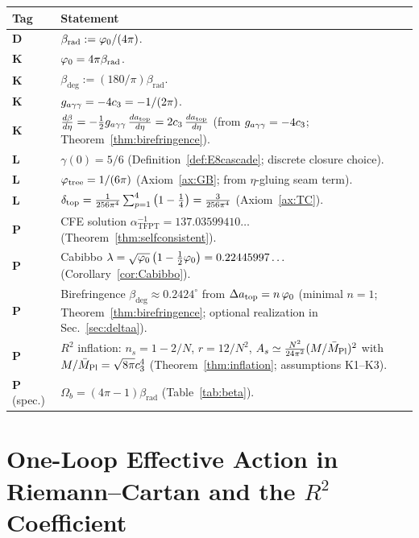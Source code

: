 \begin{center}
\renewcommand{\arraystretch}{1.2}
\begin{tabular}{@{}lp{12cm}@{}}
\toprule
\textbf{Tag} & \textbf{Statement}\\
\midrule
\textbf{D} & $\beta_{\text{rad}} := \varphi_0/(4\pi)$.\\
\textbf{K} & $\varphi_0 = 4\pi\beta_{\text{rad}}$.\\
\textbf{K} & $\beta_{\text{deg}} := (180/\pi)\beta_{\text{rad}}$.\\
\textbf{K} & $g_{a\gamma\gamma} = -4c_3 = -1/(2\pi)$.\\
\textbf{K} & $\frac{d\beta}{d\eta} = -\frac{1}{2}g_{a\gamma\gamma}\,\frac{d a_{\text{top}}}{d\eta} = 2c_3\,\frac{d a_{\text{top}}}{d\eta}$ (from $g_{a\gamma\gamma}=-4c_3$; Theorem~\ref{thm:birefringence}).\\
\textbf{L} & $\gamma(0)=5/6$ (Definition~\ref{def:E8cascade}; discrete closure choice).\\
\textbf{L} & $\varphi_{\mathrm{tree}} = 1/(6\pi)$ (Axiom~\ref{ax:GB}; from $\eta$-gluing seam term).\\
\textbf{L} & $\delta_{\mathrm{top}} = \frac{1}{256\pi^4}\sum_{p=1}^{4}\left(1-\frac{1}{4}\right)=\frac{3}{256\pi^4}$ (Axiom~\ref{ax:TC}).\\
\textbf{P} & CFE solution $\alpha^{-1}_{\text{TFPT}} = 137.03599410\ldots$ (Theorem~\ref{thm:selfconsistent}).\\
\textbf{P} & Cabibbo $\lambda = \sqrt{\varphi_0}\left(1-\frac{1}{2}\varphi_0\right)=0.22445997\ldots$ (Corollary~\ref{cor:Cabibbo}).\\
\textbf{P} & Birefringence $\beta_{\text{deg}} \approx 0.2424^\circ$ from $\Delta a_{\text{top}} = n\,\varphi_0$ (minimal $n=1$; Theorem~\ref{thm:birefringence}; optional realization in Sec.~\ref{sec:deltaa}).\\
\textbf{P} & $R^2$ inflation: $n_s=1-2/N$, $r=12/N^2$, $A_s \simeq \frac{N^2}{24\pi^2}(M/\bar{M}_{\mathrm{Pl}})^2$ with $M/\bar{M}_{\mathrm{Pl}}=\sqrt{8\pi}c_3^4$ (Theorem~\ref{thm:inflation}; assumptions K1--K3).\\
\textbf{P} (spec.) & $\Omega_b = (4\pi-1)\beta_{\text{rad}}$ (Table~\ref{tab:beta}).\\
\bottomrule
\end{tabular}
\end{center}

\section{One-Loop Effective Action in Riemann--Cartan and the $R^2$ Coefficient}
\label{app:r2}

